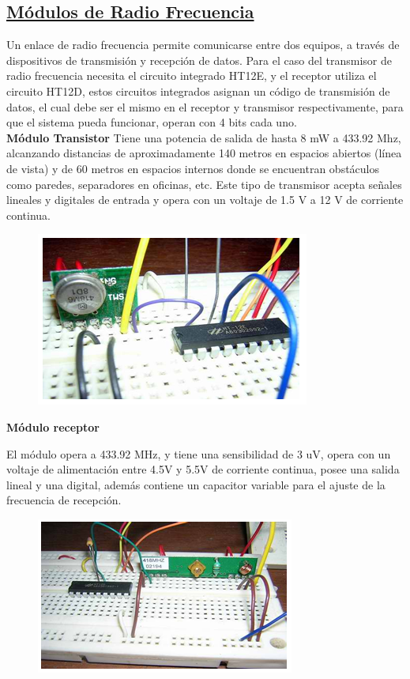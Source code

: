 \documentclass[a4paper,11pt]{article}
\begin{document}
\subsection{\underline{Módulos de Radio Frecuencia }}
Un enlace de radio frecuencia permite comunicarse entre dos equipos, a través de dispositivos de transmisión y recepción de datos. Para el caso del transmisor de radio frecuencia necesita el circuito integrado HT12E, y el receptor utiliza  el circuito HT12D, estos circuitos integrados asignan un código de transmisión de datos, el cual debe ser el mismo en el receptor y transmisor respectivamente, para que el sistema pueda funcionar, operan con 4 bits cada uno.  \\

\textbf{Módulo Transistor}
Tiene una potencia de salida de hasta 8 mW a 433.92 Mhz, alcanzando distancias de aproximadamente 140 metros en espacios abiertos (línea de vista) y de 60 metros en espacios internos donde se encuentran obstáculos como paredes, separadores en oficinas, etc. Este tipo de transmisor acepta señales lineales y digitales de entrada y opera con un voltaje de 1.5 V a 12 V de corriente continua.  

	\begin{figure}[h]
		\centering
		\includegraphics[width=0.7\linewidth]{./3}
	\end{figure}


\textbf{Módulo receptor}

El módulo opera a 433.92 MHz, y tiene una sensibilidad de 3 uV, opera con un  voltaje de alimentación entre 4.5V y 5.5V de corriente continua, posee una  salida lineal y una digital, además contiene un capacitor variable para el ajuste de la frecuencia de recepción.

	\begin{figure}[h]
		\centering
		\includegraphics[width=0.7\linewidth]{./4}
	\end{figure}
	
\end{document}
